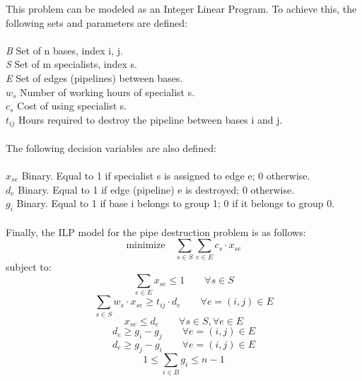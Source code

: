 \documentclass{article}
\begin{document}
This problem can be modeled as an Integer Linear Program. To achieve this, the following sets and parameters are defined:\\
\\
\textit{B} \hspace{1.3cm} Set of n bases, index i, j. \\
\textit{S} \hspace{1.3cm} Set of m specialists, index s. \\
\textit{E} \hspace{1.3cm} Set of edges (pipelines) between bases. \\
\textit{$w_s$} \hspace{1.15cm} Number of working hours of specialist s. \\
\textit{$c_s$} \hspace{1.25cm} Cost of using specialist s. \\
\textit{$t_{ij}$} \hspace{1.25cm} Hours required to destroy the pipeline between bases i and j. \\
\\
The following decision variables are also defined:\\
\\
\textit{$x_{se}$} \hspace{1.15cm} Binary. Equal to 1 if specialist s is assigned to edge e; 0 otherwise. \\
\textit{$d_e$} \hspace{1.25cm} Binary. Equal to 1 if edge (pipeline) e is destroyed; 0 otherwise. \\
\textit{$g_i$} \hspace{1.3cm} Binary. Equal to 1 if base i belongs to group 1; 0 if it belongs to group 0. \\
\\
Finally, the ILP model for the pipe destruction problem is as follows:
\begin{equation}
    \textrm{minimize} \quad \sum_{s \in S} \sum_{e \in E} c_s \cdot x_{se}
\end{equation}
subject to:
\begin{equation}
    \sum_{e \in E} x_{se} \leq 1 \qquad \forall s \in S
\end{equation}
\begin{equation}
    \sum_{s \in S} w_s \cdot x_{se} \geq t_{ij} \cdot d_e \qquad \forall e = (i,j) \in E
\end{equation}
\begin{equation}
    x_{se} \leq d_e \qquad \forall s \in S, \forall e \in E
\end{equation}
\begin{equation}
    d_e \geq g_i - g_j \qquad \forall e = (i,j) \in E
\end{equation}
\begin{equation}
    d_e \geq g_j - g_i \qquad \forall e = (i,j) \in E
\end{equation}
\begin{equation}
    1 \leq \sum_{i \in B} g_i \leq n-1
\end{equation}
\end{document}
